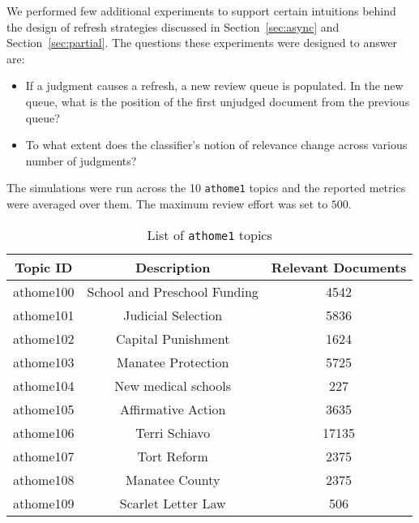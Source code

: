We performed few additional experiments to support certain intuitions behind the
design of refresh strategies discussed in Section~\ref{sec:async} and
Section~\ref{sec:partial}. The questions these experiments were designed to
answer are:
\begin{itemize}
    \item If a judgment causes a refresh, a new review queue is populated.
        In the new queue, what is the position of the first unjudged document
        from the previous queue?
    \item To what extent does the classifier's notion of relevance change across
        various number of judgments?
\end{itemize}

The simulations were run across the 10
\texttt{athome1} topics and the reported metrics were averaged over them. The
maximum review effort was set to $500$.



\begin{table}[h]
\centering
\caption{List of \texttt{athome1} topics}
\label{tab:topics_athome1}
\begin{tabular}{|c|c|c|}
\hline
\textbf{Topic ID} & \textbf{Description} & \textbf{Relevant Documents} \\ \hline \hline
athome100 & School and Preschool Funding & 4542 \\ \hline
athome101 & Judicial Selection & 5836 \\ \hline
athome102 & Capital Punishment & 1624 \\ \hline
athome103 & Manatee Protection & 5725 \\ \hline
athome104 & New medical schools & 227 \\ \hline
athome105 & Affirmative Action & 3635 \\ \hline
athome106 & Terri Schiavo & 17135 \\ \hline
athome107 & Tort Reform & 2375 \\ \hline
athome108 & Manatee County & 2375 \\ \hline
athome109 & Scarlet Letter Law & 506 \\ \hline
\end{tabular}
\end{table}


